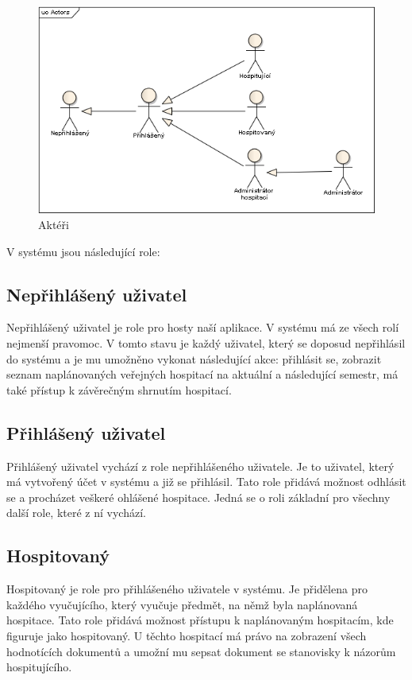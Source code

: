 \begin{figure}[h]
\begin{center}
\includegraphics[width=14cm]{figures/Actors}
\caption{Aktéři}
\label{fig:actors}
\end{center}
\end{figure}

V systému jsou následující role:

\subsection{Nepřihlášený uživatel}
Nepřihlášený uživatel je role pro hosty naší aplikace. V systému má ze všech rolí nejmenší pravomoc. V tomto stavu je každý uživatel, který se doposud nepřihlásil do systému a je mu umožněno vykonat následující akce: přihlásit se, zobrazit seznam naplánovaných veřejných hospitací na aktuální a následující semestr, má také přístup k závěrečným shrnutím hospitací.

\subsection{Přihlášený uživatel}
Přihlášený uživatel vychází z role nepřihlášeného uživatele. Je to uživatel, který má vytvořený účet v systému a již se přihlásil. Tato role přidává možnost odhlásit se a procházet veškeré ohlášené hospitace. Jedná se o roli základní pro všechny další role, které z ní vychází.

\subsection{Hospitovaný}
Hospitovaný je role pro přihlášeného uživatele v systému. Je přidělena pro každého vyučujícího, který vyučuje předmět, na němž byla naplánovaná hospitace. Tato role přidává možnost přístupu k naplánovaným hospitacím, kde figuruje jako hospitovaný. U těchto hospitací má právo na zobrazení všech hodnotících dokumentů a umožní mu sepsat dokument se stanovisky k názorům hospitujícího.

